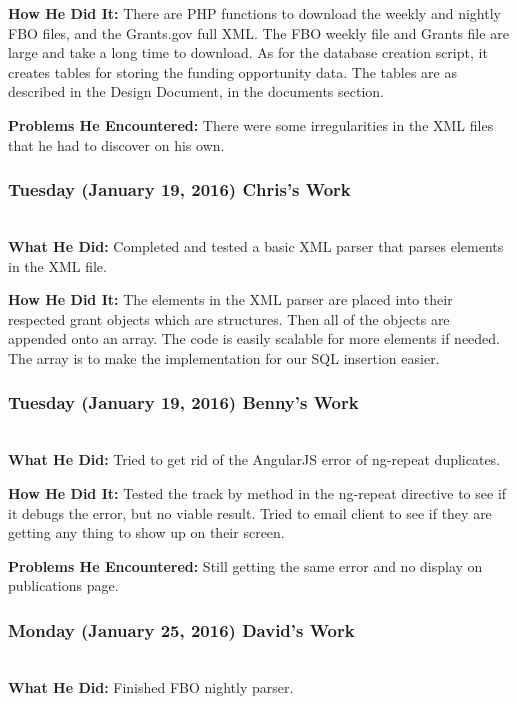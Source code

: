 \documentclass[onecolumn]{IEEEtran}
\begin{document}
	\textbf{How He Did It: }
	There are PHP functions to download the weekly and nightly FBO files, and the Grants.gov full XML. The FBO weekly file and Grants file are large and take a long time to download. As for the database creation script, it creates tables for storing the funding opportunity data. The tables are as described in the Design Document, in the documents section.   
    
	\textbf{Problems He Encountered: }
	There were some irregularities in the XML files that he had to discover on his own. 

\subsubsection{Tuesday (January 19, 2016) Chris's Work  } \hspace*{\fill} \\
    \textbf{What He Did: } Completed and tested a basic XML parser that parses elements in the XML file.   
    
	\textbf{How He Did It: }
	The elements in the XML parser are placed into their respected grant objects which are structures. Then all of the objects are appended onto an array. The code is easily scalable for more elements if needed. The array is to make the implementation for our SQL insertion easier.   

\subsubsection{Tuesday (January 19, 2016) Benny's Work  } \hspace*{\fill} \\
    \textbf{What He Did: } 
    Tried to get rid of the AngularJS error of ng-repeat duplicates.  
    
	\textbf{How He Did It: }
	Tested the track by method in the ng-repeat directive to see if it debugs the error, but no viable result. Tried to email client to see if they are getting any thing to show up on their screen.  
    
	\textbf{Problems He Encountered: }
	Still getting the same error and no display on publications page.  

\subsubsection{Monday (January 25, 2016) David's Work  } \hspace*{\fill} \\
    \textbf{What He Did: } 
    Finished FBO nightly parser.  
    
\end{document}
